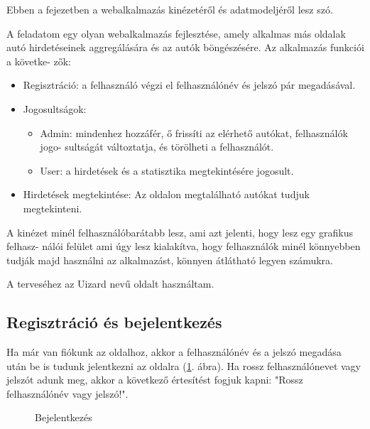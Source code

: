 Ebben a fejezetben a webalkalmazás kinézetéről és adatmodeljéről lesz szó.



A feladatom egy olyan webalkalmazás fejlesztése, amely alkalmas más oldalak autó hirdetéseinek aggregálására és az autók böngészésére. Az alkalmazás funkciói a követke-
zők:

\begin{itemize}
\item Regisztráció: a felhasználó végzi el felhasználónév és jelszó pár megadásával.
\item Jogosultságok:
	\begin{itemize}
	\item Admin: mindenhez hozzáfér, ő frissíti az elérhető autókat, felhasználók jogo-
sultságát változtatja, és törölheti a felhasználót.
	\item User: a hirdetések és a statisztika megtekintésére jogosult.
	\end{itemize}
\item Hirdetések megtekintése: Az oldalon megtalálható autókat tudjuk megtekinteni.
\end{itemize}


A kinézet minél felhasználóbarátabb lesz, ami azt jelenti, hogy lesz egy grafikus felhasz-
nálói felület ami úgy lesz kialakítva, hogy felhasználók minél könnyebben tudják majd használni az alkalmazást, könnyen átlátható legyen számukra.

A terveséhez az Uizard \cite{uizard} nevű oldalt használtam.

\subsection{Regisztráció és bejelentkezés}

Ha már van fiókunk az oldalhoz, akkor a felhasználónév és a jelszó megadása után be is tudunk jelentkezni az oldalra (\ref{fig:Bejelentkezés}. ábra). Ha rossz felhasználónevet vagy jelszót adunk meg, akkor a következő értesítést fogjuk kapni: "Rossz felhasználónév vagy jelszó!".

\newpage

\begin{figure}[h]
\centering
{}
\caption{Bejelentkezés}
\label{fig:Bejelentkezés}
\end{figure}

